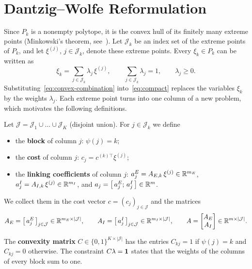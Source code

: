 \section{Dantzig--Wolfe Reformulation}
\label{sec:dantzig-wolfe}

Since $P_k$ is a nonempty polytope, it is the convex hull of its finitely many extreme points
(Minkowski's theorem, see~\cite{schrijver1986theory}). Let $\mathcal{J}_k$ be an index set of the extreme points of $P_k$,
and let $\xi^{(j)}$, $j\in\mathcal{J}_k$, denote these extreme points. Every $\xi_k\in P_k$ can be
written as
\begin{equation} \label{eq:convex-combination}
\xi_k = \sum_{j\in\mathcal{J}_k} \lambda_j\, \xi^{(j)}, \qquad
\sum_{j\in\mathcal{J}_k}\lambda_j = 1, \qquad \lambda_j \ge 0 .
\end{equation}
Substituting~\eqref{eq:convex-combination} into~\eqref{eq:compact} replaces the variables
$\xi_k$ by the weights $\lambda_j$. Each extreme point turns into one column of a new problem,
which motivates the following definitions.

\begin{definition}[Columns] \label{def:columns}
Let $\mathcal{J} = \mathcal{J}_1\cup\dots\cup\mathcal{J}_K$ (disjoint union). For
$j\in\mathcal{J}_k$ we define
\begin{itemize}
    \item the \textbf{block} of column $j$: $\psi(j) = k$;
    \item the \textbf{cost} of column $j$: $c_j = c^{(k)\top}\xi^{(j)}$;
    \item the \textbf{linking coefficients} of column $j$:
          $a_j^E = A_{E,k}\,\xi^{(j)}\in\mathbb{R}^{m_E}$, $a_j^I = A_{I,k}\,\xi^{(j)}\in\mathbb{R}^{m_I}$, and
          $a_j = \bigl[\,a_j^E;\, a_j^I\,\bigr]\in\mathbb{R}^{m}$.
\end{itemize}
We collect them in the cost vector $c = (c_j)_{j\in\mathcal{J}}$ and the matrices
\[
A_E = \bigl[\, a_j^E \,\bigr]_{j\in\mathcal{J}}\in\mathbb{R}^{m_E\times|\mathcal{J}|}, \qquad
A_I = \bigl[\, a_j^I \,\bigr]_{j\in\mathcal{J}}\in\mathbb{R}^{m_I\times|\mathcal{J}|}, \qquad
A = \begin{bmatrix} A_E \\ A_I\end{bmatrix}\in\mathbb{R}^{m\times|\mathcal{J}|}.
\]
\end{definition}

\begin{definition} \label{def:convexity}
The \textbf{convexity matrix} $C\in\{0,1\}^{K\times|\mathcal{J}|}$ has the entries
$C_{kj} = 1$ if $\psi(j) = k$ and $C_{kj} = 0$ otherwise. The constraint $C\lambda = \mathbf{1}$
states that the weights of the columns of every block sum to one.
\end{definition}

